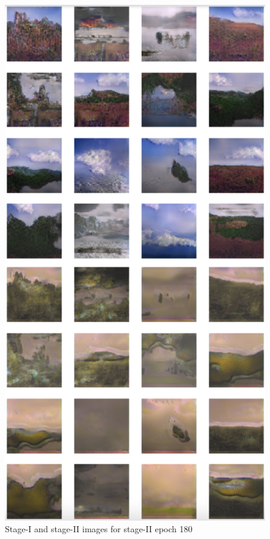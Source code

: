 \documentclass{article}
\begin{document}
	\begin{figure}[h]
	\centering
	\includegraphics[scale=0.6]{images/epoch180_FID438.png}
	\caption{Stage-I and stage-II images for stage-II epoch 180}
	\end{figure}
\end{document}
